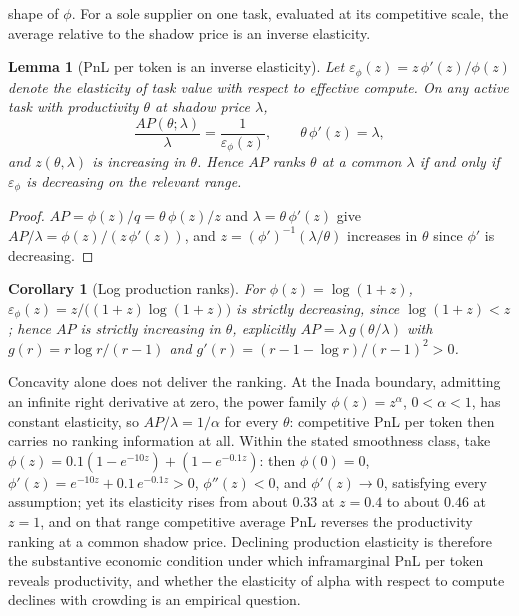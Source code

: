 \documentclass[11pt]{article}
\newtheorem{lemma}{Lemma}
\newtheorem{corollary}{Corollary}
\theoremstyle{definition}
\theoremstyle{remark}
\begin{document}
shape of $\phi$. For a sole supplier on one task, evaluated at its competitive scale, the average relative to the shadow price is an inverse elasticity.

\begin{lemma}[PnL per token is an inverse elasticity]
\label{lem:ap}
Let $\varepsilon_\phi(z) = z\,\phi'(z)/\phi(z)$ denote the elasticity of task value with respect to effective compute. On any active task with productivity $\theta$ at shadow price $\lambda$,
\begin{equation}
\frac{AP(\theta;\lambda)}{\lambda} = \frac{1}{\varepsilon_\phi(z)},
\qquad
\theta\,\phi'(z) = \lambda,
\end{equation}
and $z(\theta,\lambda)$ is increasing in $\theta$. Hence $AP$ ranks $\theta$ at a common $\lambda$ if and only if $\varepsilon_\phi$ is decreasing on the relevant range.
\end{lemma}

\begin{proof}
$AP = \phi(z)/q = \theta\,\phi(z)/z$ and $\lambda = \theta\,\phi'(z)$ give $AP/\lambda = \phi(z)/(z\,\phi'(z))$, and $z = (\phi')^{-1}(\lambda/\theta)$ increases in $\theta$ since $\phi'$ is decreasing.
\end{proof}

\begin{corollary}[Log production ranks]
\label{cor:log}
For $\phi(z) = \log(1+z)$, $\varepsilon_\phi(z) = z/\big((1+z)\log(1+z)\big)$ is strictly decreasing, since $\log(1+z) < z$; hence $AP$ is strictly increasing in $\theta$, explicitly $AP = \lambda\, g(\theta/\lambda)$ with $g(r) = r\log r/(r-1)$ and $g'(r) = (r - 1 - \log r)/(r-1)^2 > 0$.
\end{corollary}

Concavity alone does not deliver the ranking. At the Inada boundary, admitting an infinite right derivative at zero, the power family $\phi(z) = z^\alpha$, $0 < \alpha < 1$, has constant elasticity, so $AP/\lambda = 1/\alpha$ for every $\theta$: competitive PnL per token then carries no ranking information at all. Within the stated smoothness class, take $\phi(z) = 0.1(1 - e^{-10z}) + (1 - e^{-0.1z})$: then $\phi(0) = 0$, $\phi'(z) = e^{-10z} + 0.1\,e^{-0.1z} > 0$, $\phi''(z) < 0$, and $\phi'(z) \to 0$, satisfying every assumption; yet its elasticity rises from about $0.33$ at $z = 0.4$ to about $0.46$ at $z = 1$, and on that range competitive average PnL reverses the productivity ranking at a common shadow price. Declining production elasticity is therefore the substantive economic condition under which inframarginal PnL per token reveals productivity, and whether the elasticity of alpha with respect to compute declines with crowding is an empirical question.
\end{document}
